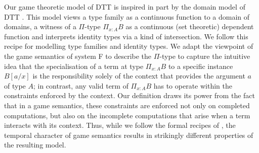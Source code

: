 \documentclass[runningheads,a4paper]{llncs}
\begin{document}
Our game theoretic model of \textsf{DTT} is inspired in part by the domain model of \textsf{DTT} \cite{palmgren1990domain}.  This model views a type family as a continuous function to a domain of domains, a witness of a $\Pi$-type $\Pi_{x:A} B$ as a continuous (set theoretic) dependent function and interprets identity types via a kind of  intersection.    We follow this recipe for modelling type families  and identity types.   We adapt the viewpoint of  the game semantics of system F \cite{abramsky2005game}
to describe the $\Pi$-type to capture the intuitive idea that the specialisation of a term at type $\Pi_{x:A} B$ to a specific instance $B[a/x]$  is the responsibility solely of the context that provides the argument $a$ of type $A$; in contrast, any valid term of $\Pi_{x:A} B$ has to operate within the constraints enforced by the context.  Our definition draws its power from the fact that in a game semantics, these constraints are enforced not only on completed computations, but also on the incomplete computations that arise when a term interacts with its context.    Thus, while we follow the formal recipes of \cite{palmgren1990domain}, the temporal character of game semantics results in strikingly different properties of the resulting model.
\end{document}
